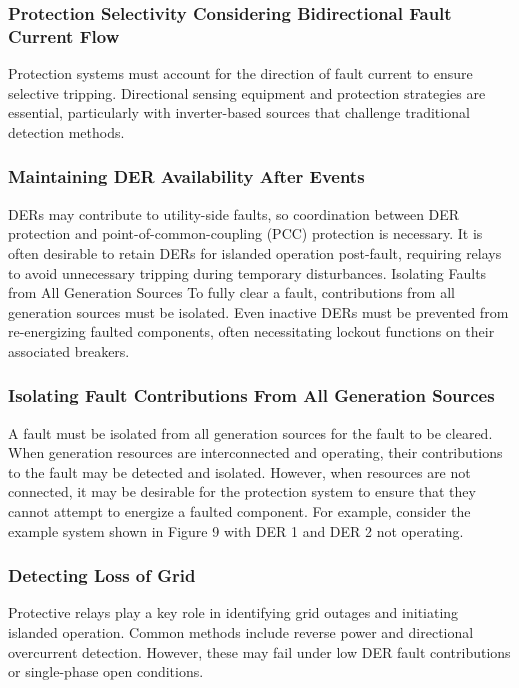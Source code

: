 \subsubsection{Protection Selectivity Considering Bidirectional Fault Current Flow}
 Protection systems must account for the direction of fault current to ensure selective tripping. Directional sensing equipment and protection strategies are essential, particularly with inverter-based sources that challenge traditional detection methods.\\

\subsubsection{Maintaining DER Availability After Events}
 DERs may contribute to utility-side faults, so coordination between DER protection and point-of-common-coupling (PCC) protection is necessary. It is often desirable to retain DERs for islanded operation post-fault, requiring relays to avoid unnecessary tripping during temporary disturbances.
Isolating Faults from All Generation Sources To fully clear a fault, contributions from all generation sources must be isolated. Even inactive DERs must be prevented from re-energizing faulted components, often necessitating lockout functions on their associated breakers.\\

\subsubsection{Isolating Fault Contributions From All Generation Sources}
A fault must be isolated from all generation sources for the fault to be cleared. When generation resources are interconnected and operating, their contributions to the fault may be detected and isolated. However, when resources are not connected, it may be desirable for the protection system 
to ensure that they cannot attempt to energize a faulted component. For example, consider the example system shown in Figure 9 with DER 1 and DER 2 not operating.

\subsubsection{Detecting Loss of Grid}
 Protective relays play a key role in identifying grid outages and initiating islanded operation. Common methods include reverse power and directional overcurrent detection. However, these may fail under low DER fault contributions or single-phase open conditions. \\
 

